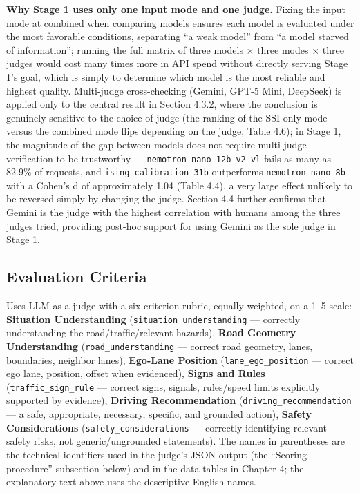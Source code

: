 \documentclass[12pt,a4paper]{report}
\begin{document}
\textbf{Why Stage 1 uses only one input mode and one judge.} Fixing the input mode at combined when comparing models ensures each model is evaluated under the most favorable conditions, separating ``a weak model'' from ``a model starved of information''; running the full matrix of three models $\times$ three modes $\times$ three judges would cost many times more in API spend without directly serving Stage 1's goal, which is simply to determine which model is the most reliable and highest quality. Multi-judge cross-checking (Gemini, GPT-5 Mini, DeepSeek) is applied only to the central result in Section 4.3.2, where the conclusion is genuinely sensitive to the choice of judge (the ranking of the SSI-only mode versus the combined mode flips depending on the judge, Table 4.6); in Stage 1, the magnitude of the gap between models does not require multi-judge verification to be trustworthy --- \texttt{nemotron-nano-12b-v2-vl} fails as many as 82.9\% of requests, and \texttt{ising-calibration-31b} outperforms \texttt{nemotron-nano-8b} with a Cohen's d of approximately 1.04 (Table 4.4), a very large effect unlikely to be reversed simply by changing the judge. Section 4.4 further confirms that Gemini is the judge with the highest correlation with humans among the three judges tried, providing post-hoc support for using Gemini as the sole judge in Stage 1.

\subsection{Evaluation Criteria}

Uses LLM-as-a-judge with a six-criterion rubric, equally weighted, on a 1--5 scale: \textbf{Situation Understanding} (\texttt{situation\_understanding} --- correctly understanding the road/traffic/relevant hazards), \textbf{Road Geometry Understanding} (\texttt{road\_understanding} --- correct road geometry, lanes, boundaries, neighbor lanes), \textbf{Ego-Lane Position} (\texttt{lane\_ego\_position} --- correct ego lane, position, offset when evidenced), \textbf{Signs and Rules} (\texttt{traffic\_sign\_rule} --- correct signs, signals, rules/speed limits explicitly supported by evidence), \textbf{Driving Recommendation} (\texttt{driving\_recommendation} --- a safe, appropriate, necessary, specific, and grounded action), \textbf{Safety Considerations} (\texttt{safety\_considerations} --- correctly identifying relevant safety risks, not generic/ungrounded statements). The names in parentheses are the technical identifiers used in the judge's JSON output (the ``Scoring procedure'' subsection below) and in the data tables in Chapter 4; the explanatory text above uses the descriptive English names.
\end{document}
